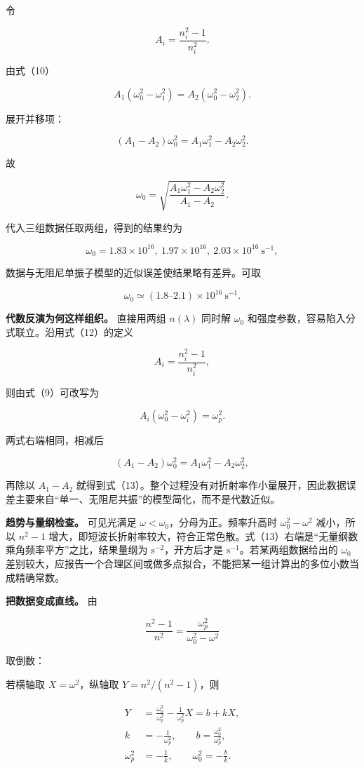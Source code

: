 \documentclass[12pt,a4paper,UTF8]{ctexart}
\begin{document}
令

\[
A_i=\frac{n_i^2-1}{n_i^2}. \tag{12}
\]

由式（10）

\[
A_1(\omega_0^2-\omega_1^2)
=A_2(\omega_0^2-\omega_2^2).
\]

展开并移项：

\[
(A_1-A_2)\omega_0^2
=A_1\omega_1^2-A_2\omega_2^2.
\]

故

\[
\boxed{
\omega_0=
\sqrt{
\frac{A_1\omega_1^2-A_2\omega_2^2}
{A_1-A_2}
}
}. \tag{13}
\]

代入三组数据任取两组，得到的结果约为

\[
\omega_0=1.83\times10^{16},
\ 1.97\times10^{16},
\ 2.03\times10^{16}\ \mathrm{s^{-1}},
\]

数据与无阻尼单振子模型的近似误差使结果略有差异。可取

\[
\boxed{\omega_0\simeq(1.8\text{--}2.1)\times10^{16}\ \mathrm{s^{-1}}}. \tag{14}
\]

\textbf{代数反演为何这样组织。} 直接用两组 \(n(\lambda)\) 同时解
\(\omega_0\) 和强度参数，容易陷入分式联立。沿用式（12）的定义

\[
A_i=\frac{n_i^2-1}{n_i^2},
\]

则由式（9）可改写为

\[
A_i(\omega_0^2-\omega_i^2)=\omega_p^2. \tag{15}
\]

两式右端相同，相减后

\[
(A_1-A_2)\omega_0^2
=A_1\omega_1^2-A_2\omega_2^2, \tag{16}
\]

再除以 \(A_1-A_2\)
就得到式（13）。整个过程没有对折射率作小量展开，因此数据误差主要来自``单一、无阻尼共振''的模型简化，而不是代数近似。

\textbf{趋势与量纲检查。} 可见光满足
\(\omega<\omega_0\)，分母为正。频率升高时 \(\omega_0^2-\omega^2\)
减小，所以 \(n^2-1\)
增大，即短波长折射率较大，符合正常色散。式（13）右端是``无量纲数乘角频率平方''之比，结果量纲为
\(\mathrm{s^{-2}}\)，开方后才是 \(\mathrm{s^{-1}}\)。若某两组数据给出的
\(\omega_0\)
差别较大，应报告一个合理区间或做多点拟合，不能把某一组计算出的多位小数当成精确常数。

\textbf{把数据变成直线。} 由

\[
\frac{n^2-1}{n^2}
=\frac{\omega_p^2}{\omega_0^2-\omega^2}
\]

取倒数：

若横轴取 \(X=\omega^2\)，纵轴取 \(Y=n^2/(n^2-1)\)，则

\[
\begin{aligned}
Y
&=\frac{\omega_0^2}{\omega_p^2}
-\frac1{\omega_p^2}X=b+kX,\\
k&=-\frac1{\omega_p^2},
\qquad b=\frac{\omega_0^2}{\omega_p^2},\\
\omega_p^2&=-\frac1k,
\qquad \omega_0^2=-\frac bk.
\end{aligned} \tag{17}
\]
\end{document}
